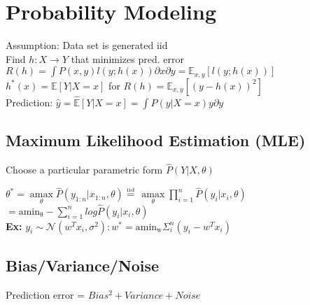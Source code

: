\section*{Probability Modeling}
Assumption: Data set is generated iid\\
Find $h:X\rightarrow Y$ that minimizes pred. error $R(h) = \int P(x,y)l(y;h(x)) \partial x \partial y = \mathbb{E}_{x,y}[l(y;h(x))]$\\
$h^*(x) = \mathbb{E}[Y|X=x]$ for $R(h) = \mathbb{E}_{x,y}[(y-h(x))^2]$\\
Prediction: $\hat{y} = \hat{\mathbb{E}}[Y|X=x] = \int \hat{P}(y|X=x)y\partial y$

\subsection*{Maximum Likelihood Estimation (MLE)}
Choose a particular parametric form $\hat{P}(Y|X,\theta)$

$\theta^* = \underset{\theta}{\operatorname{amax}} \hat{P}(y_{1:n}|x_{1:n},\theta)$
$\iid$
$\underset{\theta}{\operatorname{amax}} \prod_{i=1}^n \hat{P}(y_i|x_i, \theta)$
$= \operatorname{amin_\theta} - \sum_{i=1}^n log \hat{P}(y_i|x_i,\theta)$\\
\textbf{Ex: }$y_i \sim \mathcal{N} (w^T x_i, \sigma^2): 
w^*=\operatorname{amin_w}\Sigma_i^n(y_i-w^Tx_i)$

\iffalse
\subsection*{Example: MLE for linear Gaussian}
$y_i \sim \mathcal{N} (w^T x_i, \sigma^2):$\\
$y_i = w^T x_i + \epsilon_i, \epsilon_i \sim \mathcal{N}(0, \sigma^2)$\\
Maximizing the log likelihood:\\
$\underset{w}{\operatorname{argmax}} P(y_1,...,y_n|x_1,...,x_n,w)\\
= \underset{w}{\operatorname{argmax}} \prod \limits_i \frac{1}{\sqrt{2\pi\sigma^2}} e^{-\frac{1}{2} \frac{(y_i-w^T x_i)^2}{\sigma^2}}$\\
$= \underset{w}{\operatorname{argmin}}  \sum_i^n (y_i-w^Tx_i)^2$
\fi

\subsection*{Bias/Variance/Noise}
Prediction error = $Bias^2 + Variance + Noise$


